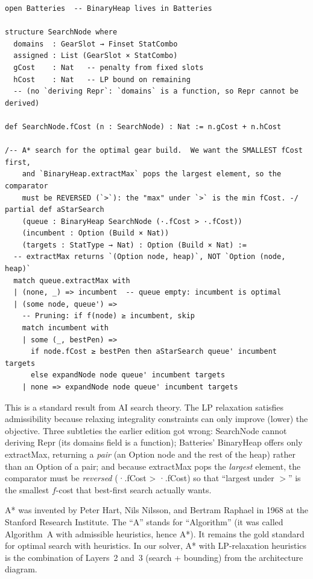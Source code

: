 \documentclass[11pt, a4paper, oneside]{book}
\newcommand{\li}[1]{{\ttfamily\small\color{deepblue}#1}}
\begin{document}
\begin{leanbox}[title={Lean 4 (Batteries) --- A* Search Skeleton}]
\begin{verbatim}
open Batteries  -- BinaryHeap lives in Batteries

structure SearchNode where
  domains  : GearSlot → Finset StatCombo
  assigned : List (GearSlot × StatCombo)
  gCost    : Nat   -- penalty from fixed slots
  hCost    : Nat   -- LP bound on remaining
  -- (no `deriving Repr`: `domains` is a function, so Repr cannot be derived)

def SearchNode.fCost (n : SearchNode) : Nat := n.gCost + n.hCost

/-- A* search for the optimal gear build.  We want the SMALLEST fCost first,
    and `BinaryHeap.extractMax` pops the largest element, so the comparator
    must be REVERSED (`>`): the "max" under `>` is the min fCost. -/
partial def aStarSearch
    (queue : BinaryHeap SearchNode (·.fCost > ·.fCost))
    (incumbent : Option (Build × Nat))
    (targets : StatType → Nat) : Option (Build × Nat) :=
  -- extractMax returns `(Option node, heap)`, NOT `Option (node, heap)`
  match queue.extractMax with
  | (none, _) => incumbent  -- queue empty: incumbent is optimal
  | (some node, queue') =>
    -- Pruning: if f(node) ≥ incumbent, skip
    match incumbent with
    | some (_, bestPen) =>
      if node.fCost ≥ bestPen then aStarSearch queue' incumbent targets
      else expandNode node queue' incumbent targets
    | none => expandNode node queue' incumbent targets
\end{verbatim}
\end{leanbox}

This is a standard result from AI search theory.  The LP relaxation satisfies
admissibility because relaxing integrality constraints can only improve
(lower) the objective.  Three subtleties the earlier edition got wrong:
\li{SearchNode} cannot \li{deriving Repr} (its \li{domains} field is a function);
Batteries' \li{BinaryHeap} offers only \li{extractMax}, returning a
\emph{pair} (an \li{Option} node and the rest of the heap) rather than an
\li{Option} of a pair; and
because \li{extractMax} pops the \emph{largest} element, the comparator must be
\emph{reversed} (\li{·.fCost > ·.fCost}) so that ``largest under $>$'' is the
smallest $f$-cost that best-first search actually wants.

\begin{histbox}
A* was invented by Peter Hart, Nils Nilsson, and Bertram Raphael in 1968
at the Stanford Research Institute.  The ``A'' stands for ``Algorithm''
(it was called Algorithm~A with admissible heuristics, hence A*).  It
remains the gold standard for optimal search with heuristics.  In our
solver, A* with LP-relaxation heuristics is the combination of Layers~2
and~3 (search + bounding) from the architecture diagram.
\end{histbox}
\end{document}
